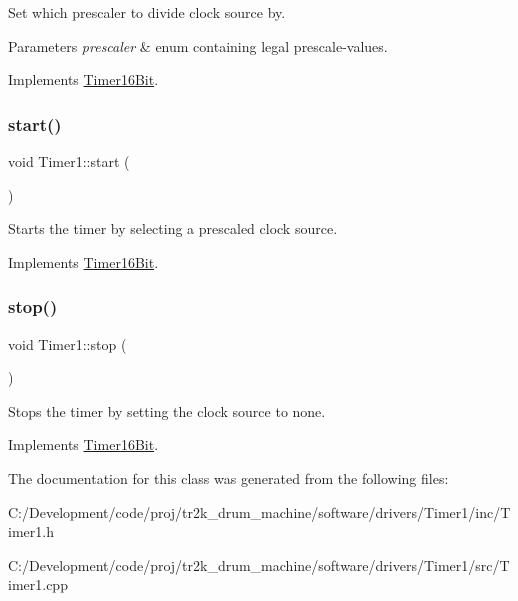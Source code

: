 Set which prescaler to divide clock source by. 
\begin{DoxyParams}{Parameters}
{\em prescaler} & enum containing legal prescale-\/values. \\
\hline
\end{DoxyParams}


Implements \mbox{\hyperlink{class_timer16_bit}{Timer16\+Bit}}.

\mbox{\label{class_timer1_a29031bd6078a40cde7e782628b598035}} 
\subsubsection{\texorpdfstring{start()}{start()}}
{\footnotesize\ttfamily void Timer1\+::start (\begin{DoxyParamCaption}{ }\end{DoxyParamCaption})\hspace{0.3cm}{\ttfamily [virtual]}}

Starts the timer by selecting a prescaled clock source. 

Implements \mbox{\hyperlink{class_timer16_bit}{Timer16\+Bit}}.

\mbox{\label{class_timer1_ace3cab44330dd29aec8182f9a4dfa6f4}} 
\subsubsection{\texorpdfstring{stop()}{stop()}}
{\footnotesize\ttfamily void Timer1\+::stop (\begin{DoxyParamCaption}{ }\end{DoxyParamCaption})\hspace{0.3cm}{\ttfamily [virtual]}}

Stops the timer by setting the clock source to none. 

Implements \mbox{\hyperlink{class_timer16_bit}{Timer16\+Bit}}.



The documentation for this class was generated from the following files\+:\begin{DoxyCompactItemize}
\item 
C\+:/\+Development/code/proj/tr2k\+\_\+drum\+\_\+machine/software/drivers/\+Timer1/inc/Timer1.\+h\item 
C\+:/\+Development/code/proj/tr2k\+\_\+drum\+\_\+machine/software/drivers/\+Timer1/src/Timer1.\+cpp\end{DoxyCompactItemize}
